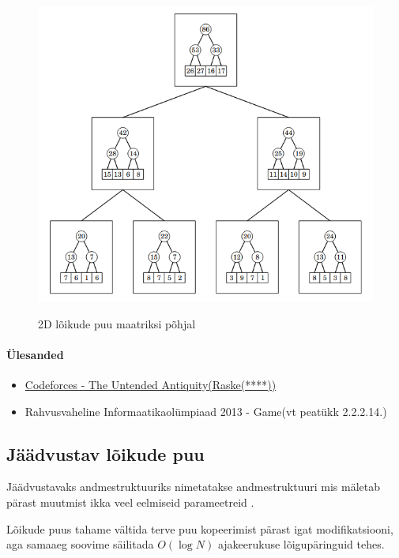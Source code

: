 \documentclass{trkut}
\theoremstyle{definition}
\begin{document}
\begin{figure}[H]%
    \includegraphics[width=16cm]{2DLPUU.png}%
    \caption{2D lõikude puu maatriksi põhjal}%
    \label{CPH}%
\end{figure}

\paragraph{Ülesanded}
\begin{itemize}
    \item \href{https://codeforces.com/problemset/problem/869/E}{Codeforces - The Untended Antiquity(Raske(****))}
    \item Rahvusvaheline Informaatikaolümpiaad 2013 - Game(vt peatükk 2.2.2.14.)
\end{itemize}
\subsection{Jäädvustav lõikude puu}
Jäädvustavaks andmestruktuuriks nimetatakse andmestruktuuri mis mäletab pärast muutmist ikka veel eelmiseid parameetreid \parencite{opik}.

Lõikude puus tahame vältida terve puu kopeerimist pärast igat modifikatsiooni, aga samaaeg soovime säilitada $O(\log N)$ ajakeerukuse lõigupäringuid tehes. \parencite{EMaxx}
\end{document}
